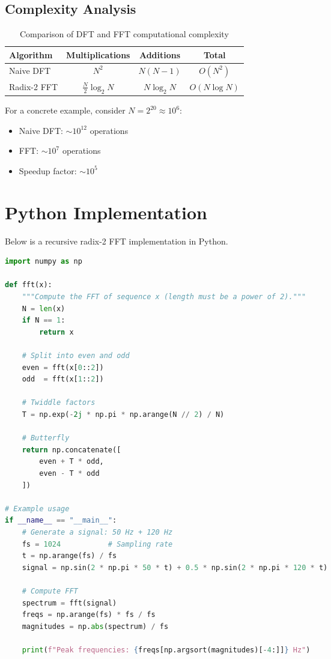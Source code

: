 \documentclass[12pt]{article}
\begin{document}
\subsection{Complexity Analysis}

\begin{table}[H]
\centering
\caption{Comparison of DFT and FFT computational complexity}
\begin{tabular}{lccc}
\toprule
\textbf{Algorithm} & \textbf{Multiplications} & \textbf{Additions} & \textbf{Total} \\
\midrule
Naive DFT          & $N^2$                     & $N(N-1)$           & $O(N^2)$ \\
Radix-2 FFT        & $\frac{N}{2}\log_2 N$    & $N \log_2 N$       & $O(N \log N)$ \\
\bottomrule
\end{tabular}
\end{table}

For a concrete example, consider $N = 2^{20} \approx 10^6$:

\begin{itemize}
  \item Naive DFT: $\sim 10^{12}$ operations
  \item FFT: $\sim 10^7$ operations
  \item Speedup factor: $\sim 10^5$
\end{itemize}

\section{Python Implementation}\label{sec:python}

Below is a recursive radix-2 FFT implementation in Python.

\begin{lstlisting}[language=Python, caption={Recursive radix-2 FFT in Python}]
import numpy as np

def fft(x):
    """Compute the FFT of sequence x (length must be a power of 2)."""
    N = len(x)
    if N == 1:
        return x

    # Split into even and odd
    even = fft(x[0::2])
    odd  = fft(x[1::2])

    # Twiddle factors
    T = np.exp(-2j * np.pi * np.arange(N // 2) / N)

    # Butterfly
    return np.concatenate([
        even + T * odd,
        even - T * odd
    ])

# Example usage
if __name__ == "__main__":
    # Generate a signal: 50 Hz + 120 Hz
    fs = 1024           # Sampling rate
    t = np.arange(fs) / fs
    signal = np.sin(2 * np.pi * 50 * t) + 0.5 * np.sin(2 * np.pi * 120 * t)

    # Compute FFT
    spectrum = fft(signal)
    freqs = np.arange(fs) * fs / fs
    magnitudes = np.abs(spectrum) / fs

    print(f"Peak frequencies: {freqs[np.argsort(magnitudes)[-4:]]} Hz")
\end{lstlisting}
\end{document}
